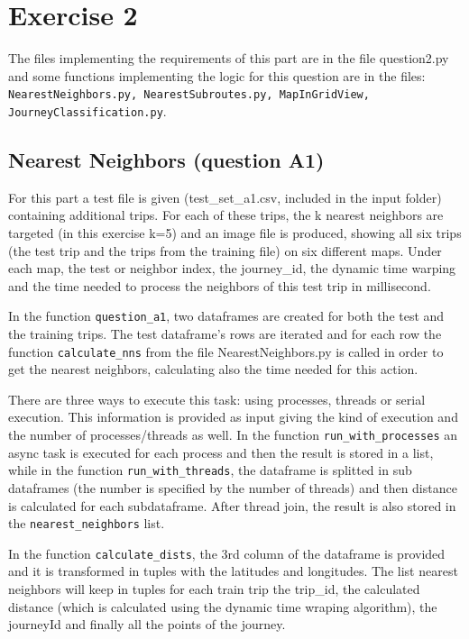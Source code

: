 \documentclass[12pt]{article}
\begin{document}
	\section{Exercise 2}
	The files implementing the requirements of this part are in the file question2.py and some functions implementing the logic for this question are in the files: \texttt{NearestNeighbors.py, NearestSubroutes.py, MapInGridView, JourneyClassification.py}.
	
	\subsection{Nearest Neighbors (question A1)}
	For this part a test file is given (test\_set\_a1.csv, included in the input folder) containing additional trips. For each of these trips, the k nearest neighbors are targeted (in this exercise k=5) and an image file is produced, showing all six trips (the test trip and the trips from the training file) on six different maps. Under each map, the test or neighbor index, the journey\_id, the dynamic time warping and the time needed to process the neighbors of this test trip in millisecond.
	
	In the function \texttt{question\_a1}, two dataframes are created for both the test and the training trips. The test dataframe's rows are iterated and for each row the function \texttt{calculate\_nns} from the file NearestNeighbors.py is called in order to get the nearest neighbors, calculating also the time needed for this action.
	
	There are three ways to execute this task: using processes, threads or serial execution. This information is provided as input giving the kind of execution and the number of processes/threads as well. In the function \texttt{run\_with\_processes} an async task is executed for each process and then the result is stored in a list, while in the function \texttt{run\_with\_threads}, the dataframe is splitted in sub dataframes (the number is specified by the number of threads) and then distance is calculated for each subdataframe. After thread join, the result is also stored in the \texttt{nearest\_neighbors} list.
	
	In the function \texttt{calculate\_dists}, the 3rd column of the dataframe is provided and it is transformed in tuples with the latitudes and longitudes. The list nearest neighbors will keep in tuples for each train trip the trip\_id, the calculated distance (which is calculated using the dynamic time wraping algorithm), the journeyId and finally all the points of the journey. 
	
\end{document}
